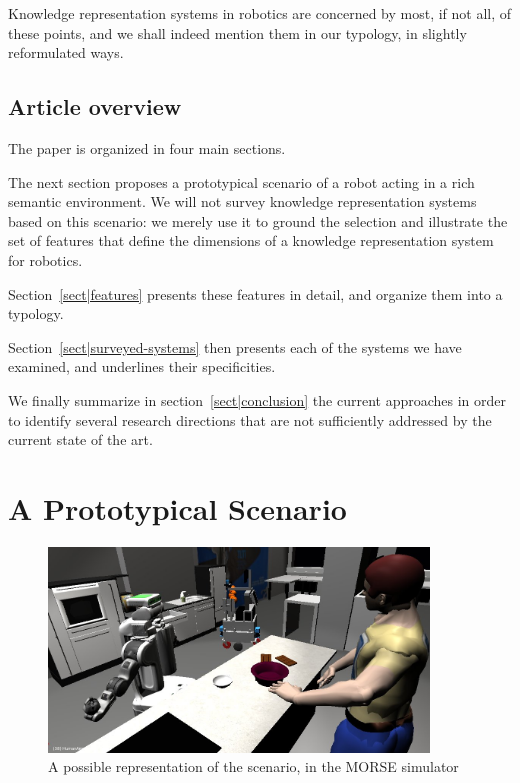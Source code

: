 \documentclass[a4paper, twocolumn]{article}
\begin{document}
Knowledge representation systems in robotics are concerned by most, if not all,
of these points, and we shall indeed mention them in our typology, in slightly
reformulated ways.

\subsection{Article overview}
\label{sect|overview}

The paper is organized in four main sections.

The next section proposes a prototypical scenario of a robot acting in a rich
semantic environment. We will not survey knowledge representation systems based
on this scenario: we merely use it to ground the selection and illustrate the
set of features that define the dimensions of a knowledge representation system
for robotics.

Section~\ref{sect|features} presents these features in detail, and organize
them into a typology.

Section~\ref{sect|surveyed-systems} then presents each of the systems we have
examined, and underlines their specificities.

We finally summarize in section~\ref{sect|conclusion} the current approaches in
order to identify several research directions that are not sufficiently
addressed by the current state of the art.

\section{A Prototypical Scenario}
\label{sect|scenario}

\begin{figure}
	\centering
	\includegraphics[width=0.9\textwidth]{figs/brownie_scenario.jpg}
	\caption{A possible representation of the scenario, in the MORSE simulator}
	\label{fig|scenario}
\end{figure}
\end{document}
